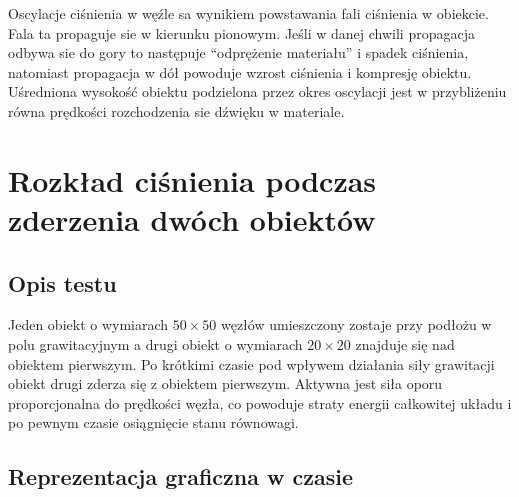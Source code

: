 \documentclass[12pt, letterpaper]{report}
\begin{document}
    Oscylacje ciśnienia w węźle sa wynikiem powstawania fali ciśnienia w obiekcie.
    Fala ta propaguje sie w kierunku pionowym. Jeśli w danej chwili propagacja odbywa sie 
    do gory to następuje ``odprężenie materiału'' i spadek ciśnienia, natomiast propagacja w dół 
    powoduje wzrost ciśnienia i kompresję obiektu. Uśredniona wysokość obiektu podzielona przez okres
    oscylacji jest w przybliżeniu równa prędkości rozchodzenia sie dźwięku w materiale.

    \clearpage
    \section{Rozkład ciśnienia podczas zderzenia dwóch obiektów}
    \subsection{Opis testu}
    Jeden obiekt o wymiarach $50 \times 50$ węzłów umieszczony zostaje przy podłożu w polu grawitacyjnym a
    drugi obiekt o wymiarach $20 \times 20$ znajduje się nad obiektem pierwszym. Po krótkimi czasie pod wpływem
    działania siły grawitacji obiekt drugi zderza się z obiektem pierwszym. Aktywna jest siła oporu 
    proporcjonalna do prędkości węzła, co powoduje straty energii całkowitej układu i po pewnym czasie osiągnięcie
    stanu równowagi.

    \subsection{Reprezentacja graficzna w czasie}
\end{document}
